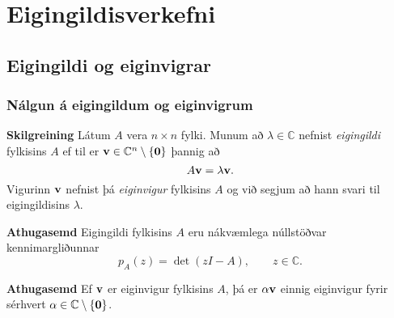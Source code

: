 \documentclass[icelandic,a4paper,12pt]{article}
\date{29. ágúst 2015}
\newcommand{\C}{{\mathbb  C}}
\begin{document}
\setcounter{tocdepth}{2}
\tableofcontents


\section{Eigingildisverkefni}




\subsection{Eigingildi og eiginvigrar}

\subsubsection{Nálgun á eigingildum og eiginvigrum} 
\textbf{Skilgreining}
Látum $A$ vera $n\times n$ fylki.  Munum að  $\lambda\in \C$ nefnist
{\it eigingildi} fylkisins $A$ ef til er $\vv\in \C^n\setminus\{\ov\}$ 
þannig að 
$$
A\mbox{${\bf v}$}=\lambda\mbox{${\bf v}$}.
$$
\pause
Vigurinn $\mbox{${\bf v}$}$ nefnist þá {\it eiginvigur } fylkisins $A$ og við
segjum að hann svari til eigingildisins $\lambda$.


\pause
\textbf{Athugasemd}
Eigingildi fylkisins $A$ eru nákvæmlega núllstöðvar kennimargliðunnar
$$
p_A(z)=\det(zI-A), \qquad z\in \C.
$$

\pause

\textbf{Athugasemd}
Ef $\mbox{${\bf v}$}$ er eiginvigur fylkisins $A$, þá er $\alpha \mbox{${\bf v}$}$ einnig
eiginvigur fyrir sérhvert $\alpha\in \C\setminus \{\ov\}$. 
\end{document}
